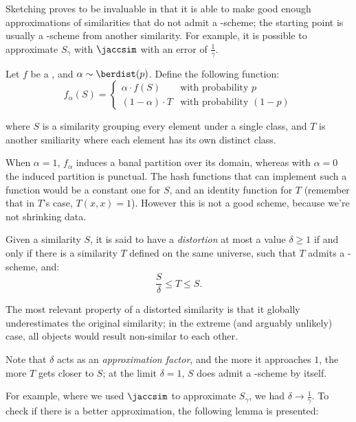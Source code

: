 Sketching proves to be invaluable in that it is able to make good enough approximations of similarities that do not admit a \lsh-scheme; the starting point is usually a \lsh-scheme from another similarity. For example, it is possible to approximate $S_\gamma$ with $\jaccsim$ with an error of $\frac{1}{\gamma}$.

\begin{example}
    Let $f$ be a \pgf, and $\alpha \sim \berdist(p)$. Define the following function:
    \[
        f_\alpha(S) = \begin{cases}
            \alpha \cdot f(S)		& \text{with probability $p$} \\
            (1 - \alpha) \cdot T	& \text{with probability $(1 - p)$}
        \end{cases}
    \]

    where $S$ is a similarity grouping every element under a single class, and $T$ is another smiliarity where each element has its own distinct class.

    When $\alpha = 1$, $f_\alpha$ induces a banal partition over its domain, whereas with $\alpha = 0$ the induced partition is punctual. The hash functions that can implement such a function would be a constant one for $S$, and an identity function for $T$ (remember that in $T$'s case, $T(x, x) = 1$). However this is not a good scheme, because we're not shrinking data.

\end{example}

\begin{definition}[Distortion]
    Given a similarity $S$, it is said to have a \emph{distortion} at most a value $\delta \geq 1$ if and only if there is a similarity $T$ defined on the same universe, such that $T$ admits a \lsh-scheme, and:
    \[
        \frac{S}{\delta} \leq T \leq S.
    \]
\end{definition}

The most relevant property of a distorted similarity is that it globally underestimates the original similarity; in the extreme (and arguably unlikely) case, all objects would result non-similar to each other.

Note that $\delta$ acts as an \emph{approximation factor}, and the more it approaches $1$, the more $T$ gets closer to $S$; at the limit $\delta = 1$, $S$ does admit a \lsh-scheme by itself.

For example, where we used $\jaccsim$ to approximate $S_\gamma$, we had $\delta \to \frac{1}{\gamma}$. To check if there is a better approximation, the following lemma is presented:

